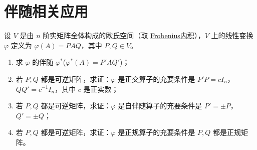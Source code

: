 \documentclass[../../main.tex]{subfiles}
\begin{document}
\section{伴随相关应用}

\begin{proposition}\label{proposition:例9.29}
设 \(V\) 是由 \(n\) 阶实矩阵全体构成的欧氏空间（取 \hyperlink{Frobenius 内积}{Frobenius内积}），\(V\) 上的线性变换 \(\varphi\) 定义为 \(\varphi(A)=PAQ\)，其中 \(P,Q\in V\)。
\begin{enumerate}[(1)]
\item 求 \(\varphi\) 的伴随 \(\varphi^*\)($\varphi^*(A)=P'AQ'$)；
\item 若 \(P,Q\) 都是可逆矩阵，求证：\(\varphi\) 是正交算子的充要条件是 \(P'P = cI_n\)，\(QQ' = c^{-1}I_n\)，其中 \(c\) 是正实数；
\item 若 \(P,Q\) 都是可逆矩阵，求证：\(\varphi\) 是自伴随算子的充要条件是 \(P' = \pm P\)，\(Q' = \pm Q\)；
\item 若 \(P,Q\) 都是可逆矩阵，求证：\(\varphi\) 是正规算子的充要条件是 \(P,Q\) 都是正规矩阵。
\end{enumerate}
\end{proposition}
\end{document}
